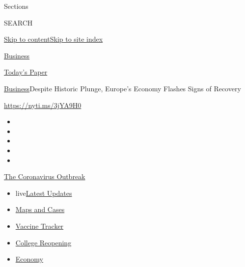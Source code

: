 Sections

SEARCH

\protect\hyperlink{site-content}{Skip to
content}\protect\hyperlink{site-index}{Skip to site index}

\href{https://www.nytimes3xbfgragh.onion/section/business}{Business}

\href{https://myaccount.nytimes3xbfgragh.onion/auth/login?response_type=cookie\&client_id=vi}{}

\href{https://www.nytimes3xbfgragh.onion/section/todayspaper}{Today's
Paper}

\href{/section/business}{Business}\textbar{}Despite Historic Plunge,
Europe's Economy Flashes Signs of Recovery

\url{https://nyti.ms/3jYA9H0}

\begin{itemize}
\item
\item
\item
\item
\item
\end{itemize}

\href{https://www.nytimes3xbfgragh.onion/news-event/coronavirus?action=click\&pgtype=Article\&state=default\&region=TOP_BANNER\&context=storylines_menu}{The
Coronavirus Outbreak}

\begin{itemize}
\tightlist
\item
  live\href{https://www.nytimes3xbfgragh.onion/2020/08/03/world/coronavirus-covid-19.html?action=click\&pgtype=Article\&state=default\&region=TOP_BANNER\&context=storylines_menu}{Latest
  Updates}
\item
  \href{https://www.nytimes3xbfgragh.onion/interactive/2020/us/coronavirus-us-cases.html?action=click\&pgtype=Article\&state=default\&region=TOP_BANNER\&context=storylines_menu}{Maps
  and Cases}
\item
  \href{https://www.nytimes3xbfgragh.onion/interactive/2020/science/coronavirus-vaccine-tracker.html?action=click\&pgtype=Article\&state=default\&region=TOP_BANNER\&context=storylines_menu}{Vaccine
  Tracker}
\item
  \href{https://www.nytimes3xbfgragh.onion/2020/08/02/us/covid-college-reopening.html?action=click\&pgtype=Article\&state=default\&region=TOP_BANNER\&context=storylines_menu}{College
  Reopening}
\item
  \href{https://www.nytimes3xbfgragh.onion/live/2020/08/03/business/stock-market-today-coronavirus?action=click\&pgtype=Article\&state=default\&region=TOP_BANNER\&context=storylines_menu}{Economy}
\end{itemize}

